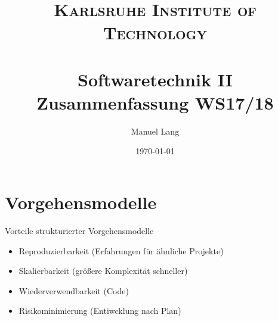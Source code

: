 \documentclass[paper=a4, fontsize=11pt]{scrartcl} %
\title{
\normalfont \normalsize
\textsc{Karlsruhe Institute of Technology} \\ [25pt] %
\horrule{0.5pt} \\[0.4cm] %
\huge Softwaretechnik II\\ Zusammenfassung WS17/18 %
\horrule{2pt} \\[0.5cm] %
}
\author{Manuel Lang} %
\date{\normalsize\today} %
\numberwithin{equation}{section} %
\numberwithin{figure}{section} %
\numberwithin{table}{section} %
\begin{document}
\maketitle %

\section{Vorgehensmodelle}

Vorteile strukturierter Vorgehensmodelle
\begin{itemize}
  \item Reproduzierbarkeit (Erfahrungen für ähnliche Projekte)
  \item Skalierbarkeit (größere Komplexität schneller)
  \item Wiederverwendbarkeit (Code)
  \item Risikominimierung (Entiwcklung nach Plan)
\end{itemize}
\end{document}
